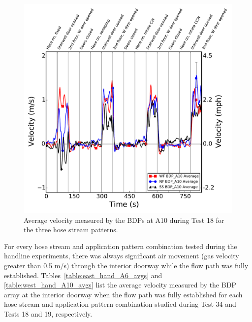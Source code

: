 \documentclass[12pt,oneside]{book}
\begin{document}
\begin{figure}[!ht]
	\includegraphics[width=\columnwidth]{../Figures/Plots/Test_18_West_063014_BDP_A10_stream_avgs}
	\caption{Average velocity measured by the BDPs at A10 during Test 18 for the three hose stream patterns.}
	\label{fig:Test_18_BDP_A10_Avg_All}
\end{figure}
\FloatBarrier

For every hose stream and application pattern combination tested during the handline experiments, there was always significant air movement (gas velocity greater than 0.5 m/s) through the interior doorway while the flow path was fully established. Tables~\ref{table:east_hand_A6_avgs} and \ref{table:west_hand_A10_avgs} list the average velocity measured by the BDP array at the interior doorway when the flow path was fully established for each hose stream and application pattern combination studied during Test 34 and Tests 18 and 19, respectively.

\end{document}
